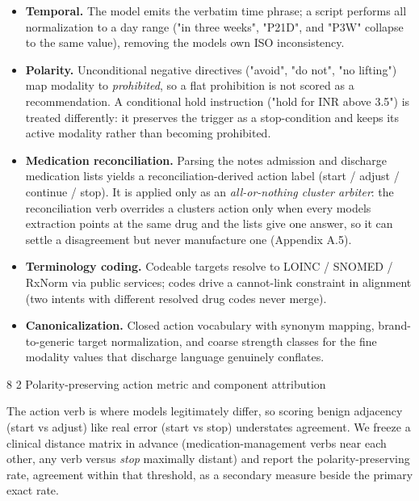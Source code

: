 \documentclass[3p,twocolumn]{elsarticle}
\makeatletter
\renewcommand\subsection{\@startsection{subsection}{2}{\z@}%
    {8\p@ \@plus 4\p@ \@minus 4\p@}%
    {2\p@ \@plus 4\p@ \@minus 3\p@}%
    {\normalfont\normalsize\itshape}}
\makeatother
\begin{document}
\begin{itemize}
\tightlist
\item
  \textbf{Temporal.} The model emits the verbatim time phrase; a script performs all normalization to a day range ("in three weeks", "P21D", and "P3W" collapse to the same value), removing the model\textquotesingle s own ISO inconsistency.
\item
  \textbf{Polarity.} Unconditional negative directives ("avoid", "do not", "no lifting") map modality to \emph{prohibited}, so a flat prohibition is not scored as a recommendation. A conditional hold instruction ("hold for INR above 3.5") is treated differently: it preserves the trigger as a stop-condition and keeps its active modality rather than becoming prohibited.
\item
  \textbf{Medication reconciliation.} Parsing the note\textquotesingle s admission and discharge medication lists yields a reconciliation-derived action label (start / adjust / continue / stop). It is applied only as an \emph{all-or-nothing cluster arbiter}: the reconciliation verb overrides a cluster\textquotesingle s action only when every model\textquotesingle s extraction points at the same drug and the lists give one answer, so it can settle a disagreement but never manufacture one (Appendix A.5).
\item
  \textbf{Terminology coding.} Codeable targets resolve to LOINC / SNOMED / RxNorm via public services; codes drive a cannot-link constraint in alignment (two intents with different resolved drug codes never merge).
\item
  \textbf{Canonicalization.} Closed action vocabulary with synonym mapping, brand-to-generic target normalization, and coarse strength classes for the fine modality values that discharge language genuinely conflates.
\end{itemize}

\subsection{Polarity-preserving action metric and component attribution}\label{a.5-polarity-preserving-action-metric-and-component-attribution}

The action verb is where models legitimately differ, so scoring benign adjacency (start vs adjust) like real error (start vs stop) understates agreement. We freeze a clinical distance matrix in advance (medication-management verbs near each other, any verb versus \emph{stop} maximally distant) and report the polarity-preserving rate, agreement within that threshold, as a secondary measure beside the primary exact rate.
\end{document}
